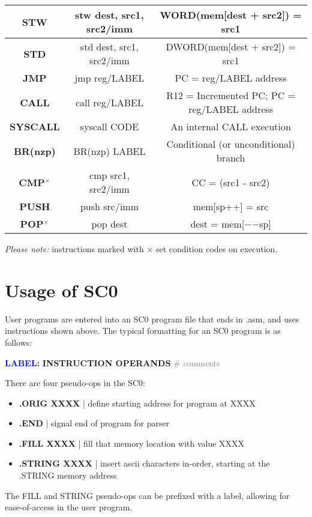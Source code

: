 \documentclass{article}
\newcommand*\scc[1]{{#1}\textbf{$^\times$}}
\begin{document}
\begin{tableofcontents}
\begin{center}
\begin{tabular}{|c|c|c|}
\textbf{STW} & stw dest, src1, src2/imm & WORD(mem[dest + src2]) = src1 \\
\hline
\textbf{STD} & std dest, src1, src2/imm & DWORD(mem[dest + src2]) = src1 \\
\hline
\textbf{JMP} & jmp reg/LABEL & PC = reg/LABEL address \\
\hline
\textbf{CALL} & call reg/LABEL & R12 = Incremented PC; PC = reg/LABEL address \\
\hline
\textbf{SYSCALL} & syscall CODE & An internal CALL execution \\
\hline
\textbf{BR(nzp)} & BR(nzp) LABEL & Conditional (or unconditional) branch \\
\hline
\textbf{\scc{CMP}} & cmp src1, src2/imm & CC = (src1 - src2) \\
\hline
\textbf{PUSH} & push src/imm & mem[sp++] = src \\
\hline
\textbf{\scc{POP}} & pop dest & dest = mem[$-$$-$sp] \\
\hline
\end{tabular}
\end{center}
\textit{\Large Please note:} instructions marked with $\times$ set condition codes on execution.
\section{\Huge Usage of SC0}
\begin{Large}
User programs are entered into an SC0 program file that ends in .asm, 
and uses instructions shown above. The typical formatting for an SC0 program
is as follows:
\begin{center}
\textcolor{blue}{\textbf{LABEL:}} \textbf{INSTRUCTION OPERANDS} \textcolor{gray}{ \# comments}
\end{center}
There are four pseudo-ops in the SC0:
\begin{itemize}
    \item \textbf{.ORIG XXXX} | define starting address for program at XXXX
    \item \textbf{.END} | signal end of program for parser
    \item \textbf{.FILL XXXX} | fill that memory location with value XXXX
    \item \textbf{.STRING XXXX} | insert ascii characters in-order, starting at the .STRING memory address
\end{itemize}
The FILL and STRING pseudo-ops can be prefixed with a label, allowing for ease-of-access
in the user program.


\end{Large}
\end{tableofcontents}
\end{document}
